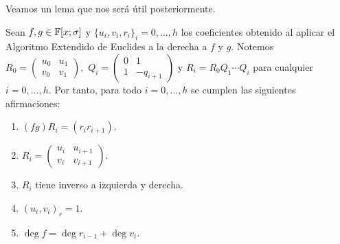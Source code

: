 Veamos un lema que nos será útil posteriormente.

\begin{lemma}
\label{lem:reea}
    Sean \(f, g \in \mathbb{F}[x; \sigma] \) y \(  {\{u_{i}, v_{i}, r_{i}\}}_i = 0, \ldots, h\) los coeficientes obtenido al aplicar el Algoritmo Extendido de Euclides a la derecha a \(f\) y \(g\). Notemos \(R_{0} =
    \begin{pmatrix}
    u_0 & u_1 \\
    v_0 & v_1
    \end{pmatrix},\)
    \(Q_i =
    \begin{pmatrix}
        0 & 1 \\
        1 & -q_{i+1}
    \end{pmatrix}
    \)
    y \(R_i =  R_0 Q_1 \cdots Q_i\) para cualquier \(i = 0, \ldots, h\). Por tanto, para todo \(i = 0, \ldots, h\) se cumplen las siguientes afirmaciones:

    \begin{enumerate}
        \item \((fg)R_i = (r_{i} r_{i+1})\).
        \item \(R_i =
            \begin{pmatrix}
            u_i &  u_{i+1} \\
            v_{i} & v_{i+1}
            \end{pmatrix}\).
        \item \(R_i\) tiene inverso a izquierda y derecha.
        \item \((u_i, v_i)_r = 1\).
        \item \(\deg f = \deg r_{i-1} + \deg v_{i}\).

    \end{enumerate}
\end{lemma}
